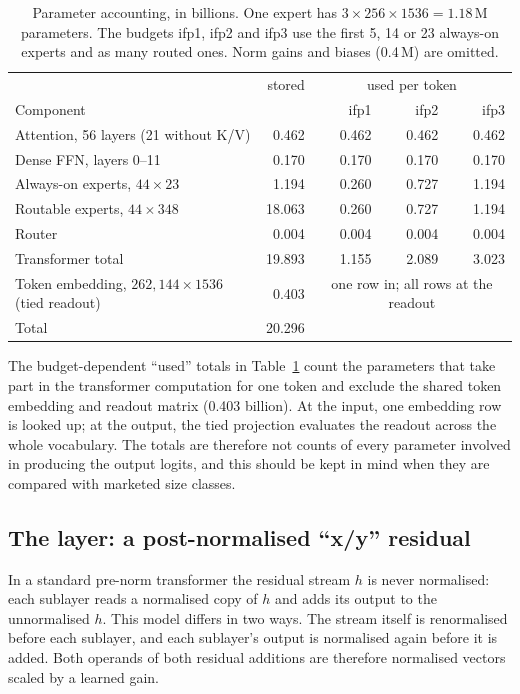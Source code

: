 \documentclass[11pt,reqno]{amsart}
\theoremstyle{definition}
\begin{document}
\begin{table}[!htbp]
\centering\small
\begin{tabular}{@{}p{66mm}rrrr@{}}
\toprule
 & stored & \multicolumn{3}{c}{used per token} \\
Component & & ifp1 & ifp2 & ifp3 \\
\midrule
Attention, 56 layers (21 without K/V) & 0.462 & 0.462 & 0.462 & 0.462 \\
Dense FFN, layers 0--11 & 0.170 & 0.170 & 0.170 & 0.170 \\
Always-on experts, $44\times23$ & 1.194 & 0.260 & 0.727 & 1.194 \\
Routable experts, $44\times348$ & 18.063 & 0.260 & 0.727 & 1.194 \\
Router & 0.004 & 0.004 & 0.004 & 0.004 \\
\midrule
Transformer total & 19.893 & 1.155 & 2.089 & 3.023 \\
Token embedding, $262{,}144\times1536$ (tied readout) & 0.403 & \multicolumn{3}{c}{one row in; all rows at the readout} \\
\midrule
Total & 20.296 & & & \\
\bottomrule
\end{tabular}
\caption{Parameter accounting, in billions. One expert has $3\times256\times1536=1.18$\,M parameters. The budgets ifp1, ifp2 and ifp3 use the first 5, 14 or 23 always-on experts and as many routed ones. Norm gains and biases (0.4\,M) are omitted.}\label{tab:params}
\end{table}

\noindent The budget-dependent ``used'' totals in Table~\ref{tab:params} count the parameters that take part in the transformer computation for one token and exclude the shared token embedding and readout matrix (0.403 billion). At the input, one embedding row is looked up; at the output, the tied projection evaluates the readout across the whole vocabulary. The totals are therefore not counts of every parameter involved in producing the output logits, and this should be kept in mind when they are compared with marketed size classes.

\subsection{The layer: a post-normalised ``x/y'' residual}

In a standard pre-norm transformer the residual stream $h$ is never normalised: each sublayer reads a normalised copy of $h$ and adds its output to the unnormalised $h$. This model differs in two ways. The stream itself is renormalised before each sublayer, and each sublayer's output is normalised again before it is added. Both operands of both residual additions are therefore normalised vectors scaled by a learned gain.
\end{document}
